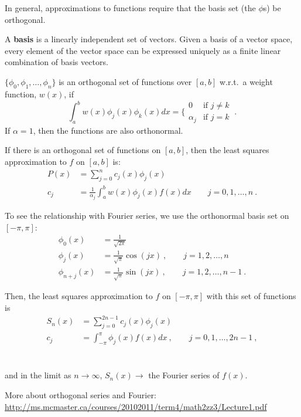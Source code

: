 \documentclass[12pt]{exam}
\begin{document}
In general, approximations to functions require that the basis set (the $\phi$s) be orthogonal. 

A \textbf{basis} is a linearly independent set of vectors. Given a basis of a vector space, every element of the vector space can be expressed uniquely as a finite linear combination of basis vectors.

$\{ \phi_0, \phi_1, \dots, \phi_n\}$ is an orthogonal set of functions over $[a,b]$ w.r.t.\ a weight function, $w(x)$, if
%
\begin{equation}
\int_a^b w(x) \phi_j(x) \phi_k(x) dx = \biggl\{
\begin{array}{ll}
0 & \mbox{if } j \neq k \\
\alpha_j & \mbox{if } j = k
\end{array}\:. \nonumber
\end{equation}
%
If $\alpha = 1$, then the functions are also orthonormal.

If there is an orthogonal set of functions on $[a,b]$, then the least squares approximation to $f$ on $[a,b]$ is:
\begin{align*}
P(x) &= \sum_{j=0}^n c_j(x) \phi_j(x) \\
c_j &= \frac{1}{\alpha_j} \int_a^b w(x)\phi_j(x)f(x)dx \qquad j=0, 1, \dots, n\:.
\end{align*}

To see the relationship with Fourier series, we use the orthonormal basis set on $[-\pi, \pi]$:
%
\begin{align*}
\phi_0(x) &= \frac{1}{\sqrt{2\pi}} \\
\phi_j(x) &= \frac{1}{\sqrt{\pi}}\cos(jx)\:, \qquad j=1,2,\dots,n \\
\phi_{n+j}(x) &= \frac{1}{\sqrt{\pi}}\sin(jx)\:, \qquad j=1,2,\dots,n-1 \:.
\end{align*}

Then, the least squares approximation to $f$ on $[-\pi,\pi]$ with this set of functions is
%
\ifprintanswers
\begin{align*}
S_n(x) &= \sum_{j=0}^{2n-1} c_j(x) \phi_j(x) \\
c_j &= \int_{-\pi}^{\pi} \phi_j(x)f(x)dx \:, \qquad j=0, 1, \dots, 2n-1 \:,
\end{align*}
\else
\\\vspace*{5em}\\
\fi
%
and in the limit as $n \rightarrow \infty$, $S_n(x) \rightarrow$ the Fourier series of $f(x)$.  

More about orthogonal series and Fourier:\\ \href{http://ms.mcmaster.ca/courses/20102011/term4/math2zz3/Lecture1.pdf}{http://ms.mcmaster.ca/courses/20102011/term4/math2zz3/Lecture1.pdf}


%
% 
\end{document}
